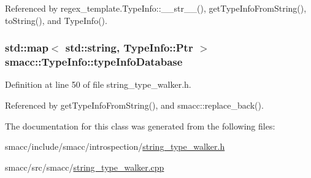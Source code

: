 Referenced by regex\+\_\+template.\+Type\+Info\+::\+\_\+\+\_\+str\+\_\+\+\_\+(), get\+Type\+Info\+From\+String(), to\+String(), and Type\+Info().

\subsubsection[{\texorpdfstring{type\+Info\+Database}{typeInfoDatabase}}]{\setlength{\rightskip}{0pt plus 5cm}std\+::map$<$ std\+::string, {\bf Type\+Info\+::\+Ptr} $>$ smacc\+::\+Type\+Info\+::type\+Info\+Database\hspace{0.3cm}{\ttfamily [static]}}\hypertarget{classsmacc_1_1TypeInfo_a5dafa5950a93f6cd5b88d5ea573a504c}{}\label{classsmacc_1_1TypeInfo_a5dafa5950a93f6cd5b88d5ea573a504c}


Definition at line 50 of file string\+\_\+type\+\_\+walker.\+h.



Referenced by get\+Type\+Info\+From\+String(), and smacc\+::replace\+\_\+back().



The documentation for this class was generated from the following files\+:\begin{DoxyCompactItemize}
\item 
smacc/include/smacc/introspection/\hyperlink{string__type__walker_8h}{string\+\_\+type\+\_\+walker.\+h}\item 
smacc/src/smacc/\hyperlink{string__type__walker_8cpp}{string\+\_\+type\+\_\+walker.\+cpp}\end{DoxyCompactItemize}
